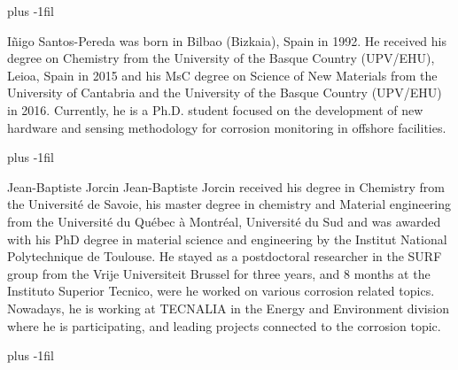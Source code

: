 \documentclass[journal,twoside,web]{ieeecolor}
\begin{document}
\baselineskip plus -1fil
\begin{IEEEbiography}{Iñigo Santos-Pereda}
was born in Bilbao (Bizkaia), Spain in 1992. He received his degree on Chemistry from the University of the Basque Country (UPV/EHU), Leioa, Spain in 2015 and his MsC degree on Science of New Materials from the University of Cantabria and the University of the Basque Country (UPV/EHU) in 2016. Currently, he is a Ph.D. student focused on the development of new hardware and sensing methodology for corrosion monitoring in offshore facilities.
\end{IEEEbiography}
\baselineskip plus -1fil
\begin{IEEEbiography}{Jean-Baptiste Jorcin}
Jean-Baptiste Jorcin received his degree in Chemistry from the Université de Savoie, his master degree in chemistry and Material engineering from the Université du Québec à Montréal, Université du Sud and was awarded with his PhD degree in material science and engineering by the Institut National Polytechnique de Toulouse. He stayed as a postdoctoral researcher in the SURF group from the Vrije Universiteit Brussel for three years, and 8 months at the Instituto Superior Tecnico,  were he worked on various corrosion related topics. Nowadays, he is working at TECNALIA in the Energy and Environment division where he is participating, and leading projects connected to the corrosion topic.
\end{IEEEbiography}
\baselineskip plus -1fil
\end{document}
